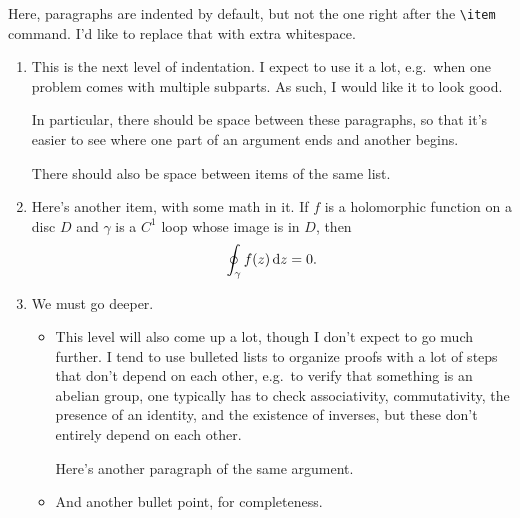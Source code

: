 \documentclass[onesided]{../pset_d}
\begin{document}
\begin{enumerate}
Here, paragraphs are indented by default, but not the one right after the \verb+\item+ command. I'd like to replace
that with extra whitespace.
\begin{enumerate}
	\item This is the next level of indentation. I expect to use it a lot, e.g.\ when one problem comes with
	multiple subparts. As such, I would like it to look good.

	In particular, there should be space between these paragraphs, so that it's easier to see where one part of an
	argument ends and another begins.

	There should also be space between items of the same list.
	\item Here's another item, with some math in it. If \(f\) is a holomorphic function on a disc \(D\) and
	\(\gamma\) is a \(C^1\) loop whose image is in \(D\), then
	\[\oint_\gamma f(z)\,\mathrm d z = 0.\]
	\item We must go deeper.
	\begin{itemize}
		\item This level will also come up a lot, though I don't expect to go much further. I tend to use bulleted
		lists to organize proofs with a lot of steps that don't depend on each other, e.g.\ to verify that
		something is an abelian group, one typically has to check associativity, commutativity, the presence of an
		identity, and the existence of inverses, but these don't entirely depend on each other.

		Here's another paragraph of the same argument.
		\item And another bullet point, for completeness.
	\end{itemize}
\end{enumerate}
\end{enumerate}
\end{document}
